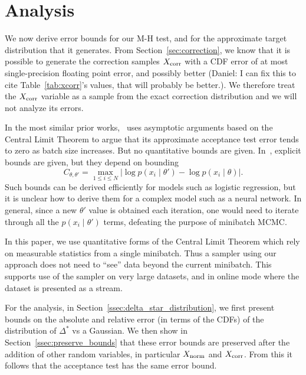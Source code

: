 \documentclass{article}
\begin{document}
\section{Analysis}\label{sec:analysis}

We now derive error bounds for our M-H test, and for the approximate target
distribution that it generates. From Section~\ref{sec:correction}, we know that
it is possible to generate the correction samples $X_{\rm corr}$ with a CDF
error of at most single-precision floating point error, and possibly better
{\color{blue} (Daniel: I can fix this to cite Table~\ref{tab:xcorr}'s values,
that will probably be better.)}. We therefore treat the $X_{\rm corr}$ variable
as a sample from the exact correction distribution and we will not analyze its
errors.

In the most similar prior works,~\cite{cutting_mh_2014} uses asymptotic
arguments based on the Central Limit Theorem to argue that its approximate
acceptance test error tends to zero as batch size increases. But no quantitative
bounds are given. In~\cite{icml2014c1_bardenet14}, explicit bounds are given,
but they depend on bounding
\begin{equation}\label{eq:bad_bound}
    C_{\theta, \theta'} = \max_{1\leq i\leq N}|\log p(x_i\mid\theta') - \log p(x_i\mid\theta)|.
\end{equation}
Such bounds can be derived efficiently for models such as logistic regression,
but it is unclear how to derive them for a complex model such as a neural
network. In general, since a new $\theta'$ value is obtained each iteration, one
would need to iterate through all the $p(x_i\mid \theta')$ terms, defeating the
purpose of minibatch MCMC.

In this paper, we use quantitative forms of the Central Limit Theorem which rely
on measurable statistics from a single minibatch. Thus a sampler using our
approach does not need to ``see'' data beyond the current minibatch. This
supports use of the sampler on very large datasets, and in online mode where the
dataset is presented as a stream.

For the analysis, in Section~\ref{ssec:delta_star_distribution}, we first
present bounds on the absolute and relative error (in terms of the CDFs) of the
distribution of $\Delta^*$ vs a Gaussian. We then show in
Section~\ref{ssec:preserve_bounds} that these error bounds are preserved after
the addition of other random variables, in particular $X_{\rm norm}$ and $X_{\rm
corr}$. From this it follows that the acceptance test has the same error bound.
\end{document}

